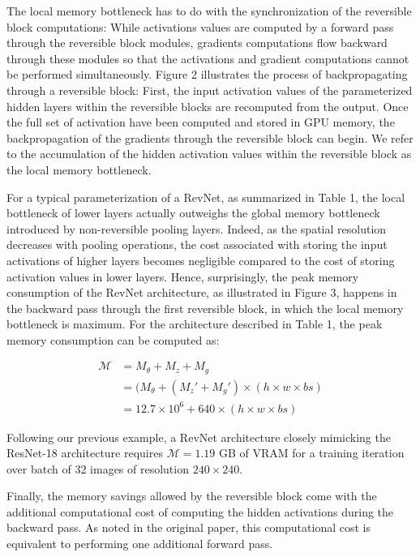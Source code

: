 \documentclass[twocolumn]{bmcart}
\begin{document}
The local memory bottleneck has to do with the synchronization of the reversible block computations:
While activations values are computed by a forward pass through the reversible block modules,
gradients computations flow backward through these modules so that the activations and gradient
computations cannot be performed simultaneously.
Figure 2 illustrates the process of backpropagating through a reversible block:
First, the input activation values of the parameterized hidden layers within the reversible blocks are recomputed from the output.
Once the full set of activation have been computed and stored in GPU memory, the backpropagation of the gradients through the reversible block can begin.
We refer to the accumulation of the hidden activation values within the reversible block as the local memory bottleneck.

For a typical parameterization of a RevNet, as summarized in Table 1,
the local bottleneck of lower layers actually outweighs the global memory bottleneck introduced by non-reversible pooling layers.
Indeed, as the spatial resolution decreases with pooling operations,
the cost associated with storing the input activations of higher layers becomes
negligible compared to the cost of storing activation values in lower layers.
Hence, surprisingly, the peak memory consumption of the RevNet architecture, as illustrated in Figure 3,
happens in the backward pass through the first reversible block,
in which the local memory bottleneck is maximum.
For the architecture described in Table 1, the peak memory consumption can be computed as:

\begin{subequations}
\begin{align}
\mathcal{M} &= M_{\theta} + M_{z} + M_{g} \\
            &=(M_{\theta} + (M_z' + M_{g}') \times (h \times w \times bs) \\
            &= 12.7 \times 10^6 + 640 \times (h \times w \times bs)
\end{align}
\end{subequations}

Following our previous example, a RevNet architecture closely mimicking the ResNet-18 architecture
requires $\mathcal{M}=1.19$ GB of VRAM for a training iteration over batch of 32 images of resolution $240 \times 240$.

Finally, the memory savings allowed by the reversible block come with the additional computational cost of computing the hidden activations during the backward pass.
As noted in the original paper, this computational cost is equivalent to performing one additional forward pass.
\end{document}
